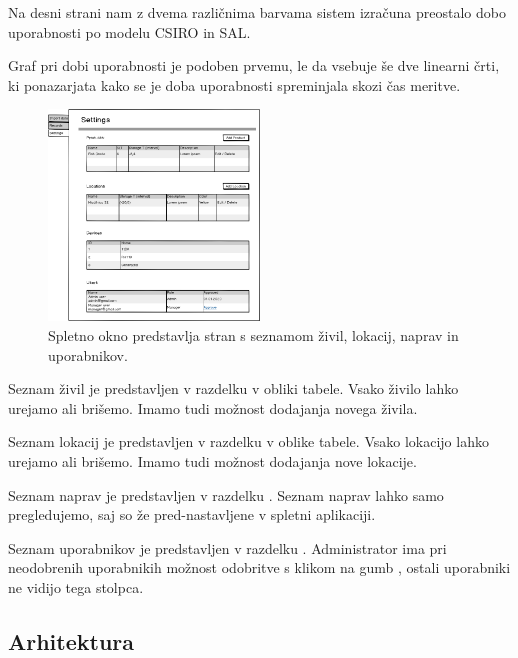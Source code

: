 \documentclass[a4paper, 12pt]{book}
\begin{document}
Na desni strani nam z dvema različnima barvama sistem izračuna preostalo dobo uporabnosti po modelu CSIRO in SAL.

Graf pri dobi uporabnosti je podoben prvemu, le da vsebuje še dve linearni črti, ki ponazarjata kako se je doba uporabnosti spreminjala skozi čas meritve.

\vspace{5mm}

\begin{figure}[h]
\begin{center}
\includegraphics[width=0.5\textwidth]{slike/Settings.png}
\end{center}
\caption{Spletno okno predstavlja stran s seznamom živil, lokacij, naprav in uporabnikov.}
\label{settings-wireframe}
\end{figure}

Seznam živil je predstavljen v razdelku  v obliki tabele. Vsako živilo lahko urejamo ali brišemo. Imamo tudi možnost dodajanja novega živila. 

Seznam lokacij je predstavljen v razdelku  v oblike tabele. Vsako lokacijo lahko urejamo ali brišemo. Imamo tudi možnost dodajanja nove lokacije.

Seznam naprav je predstavljen v razdelku . Seznam naprav lahko samo pregledujemo, saj so že pred-nastavljene v spletni aplikaciji.

Seznam uporabnikov je predstavljen v razdelku . 
Administrator ima pri neodobrenih uporabnikih možnost odobritve s klikom na gumb , ostali uporabniki ne vidijo tega stolpca. 



\subsection{Arhitektura}
\end{document}
